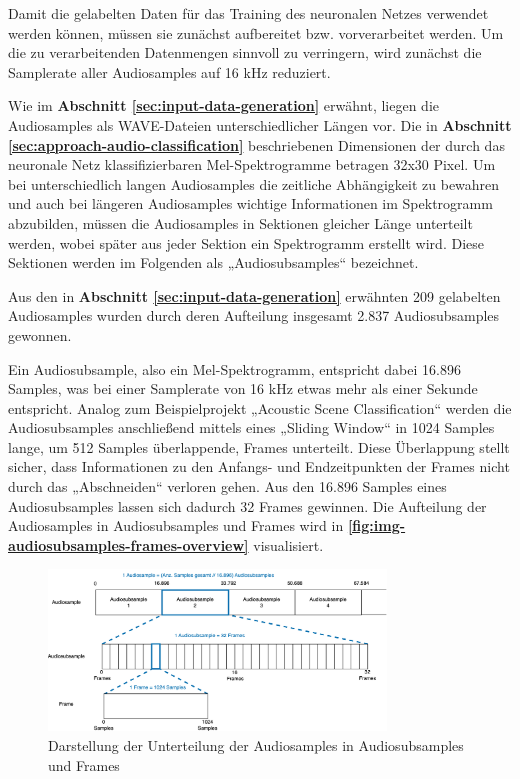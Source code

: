 Damit die gelabelten Daten für das Training des neuronalen Netzes verwendet werden können, müssen sie zunächst aufbereitet bzw. vorverarbeitet werden. Um die zu verarbeitenden Datenmengen sinnvoll zu verringern, wird zunächst die Samplerate aller Audiosamples auf 16 kHz reduziert.

Wie im \textbf{Abschnitt \ref{sec:input-data-generation}} erwähnt, liegen die Audiosamples als WAVE-Dateien unterschiedlicher Längen vor. Die in \textbf{Abschnitt \ref{sec:approach-audio-classification}} beschriebenen Dimensionen der durch das neuronale Netz klassifizierbaren Mel-Spektrogramme betragen 32x30 Pixel. Um bei unterschiedlich langen Audiosamples die zeitliche Abhängigkeit zu bewahren und auch bei längeren Audiosamples wichtige Informationen im Spektrogramm abzubilden, müssen die Audiosamples in Sektionen gleicher Länge unterteilt werden, wobei später aus jeder Sektion ein Spektrogramm erstellt wird. Diese Sektionen werden im Folgenden als „Audiosubsamples“ bezeichnet.

Aus den in \textbf{Abschnitt \ref{sec:input-data-generation} }erwähnten 209 gelabelten Audiosamples wurden durch deren Aufteilung insgesamt 2.837 Audiosubsamples gewonnen.

Ein Audiosubsample, also ein Mel-Spektrogramm, entspricht dabei 16.896 Samples, was bei einer Samplerate von 16 kHz etwas mehr als einer Sekunde entspricht. Analog zum Beispielprojekt „Acoustic Scene Classification“ \cite{stm-asc}\cite{stm-asc-2} werden die Audiosubsamples anschließend mittels eines „Sliding Window“ in 1024 Samples lange, um 512 Samples überlappende, Frames unterteilt.  Diese Überlappung stellt sicher, dass Informationen zu den Anfangs- und Endzeitpunkten der Frames nicht durch das „Abschneiden“ verloren gehen. Aus den 16.896 Samples eines Audiosubsamples lassen sich dadurch 32 Frames gewinnen. Die Aufteilung der Audiosamples in Audiosubsamples und Frames wird in \textbf{\autoref{fig:img-audiosubsamples-frames-overview}} visualisiert.

\begin{figure}[h!]
\centering
\includegraphics[width=0.8\textwidth]{images/08_durchfuehrung/nn/audiosubsamples_frames_overview.png}
\caption{Darstellung der Unterteilung der Audiosamples in Audiosubsamples und Frames}
\label{fig:img-audiosubsamples-frames-overview}
\end{figure}

